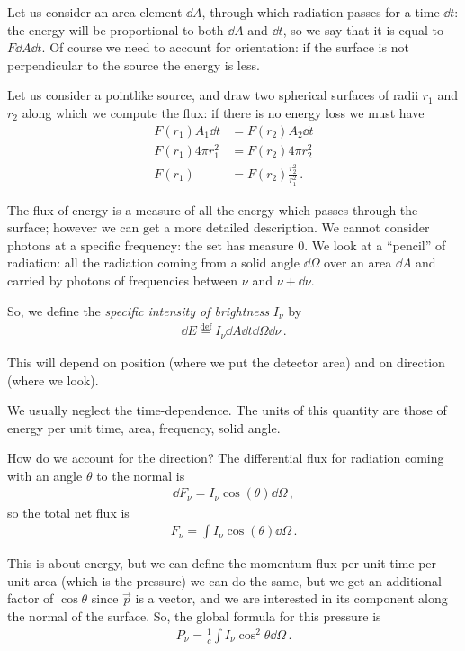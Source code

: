 \documentclass[main.tex]{subfiles}
\begin{document}
Let us consider an area element \(\dd{A}\), through which radiation passes for a time \(\dd{t}\): the energy will be proportional to both \(\dd{A}\) and \(\dd{t}\), so we say that it is equal to \(F \dd{A} \dd{t}\). Of course we need to account for orientation: if the surface is not perpendicular to the source the energy is less. 

Let us consider a pointlike source, and draw two spherical surfaces of radii \(r_1 \) and \(r_2 \) along which we compute the flux: if there is no energy loss we must have 
%
\begin{align}
F(r_1 ) A_1 \dd{t} &= F(r_2 ) A_2 \dd{t}  \\
 F(r_1 ) 4 \pi r_1^2 &= F(r_2 ) 4 \pi r_2^2 \\
 F(r_1 ) &= F(r_2 ) \frac{r_2^2}{r_1^2}
\,.
\end{align}

The flux of energy is a measure of all the energy which passes through the surface; however we can get a more detailed description. 
We cannot consider photons at a specific frequency: the set has measure 0. 
We look at a ``pencil'' of radiation: all the radiation coming from a solid angle \(\dd{\Omega  }\) over an area \(\dd{A}\) and carried by photons of frequencies between \(\nu \) and \(\nu + \dd{\nu }\).

So, we define the \emph{specific intensity of brightness} \(I_{\nu }\) by
%
\begin{align}
\dd{E} \overset{\text{def}}{=} I_{\nu } \dd{A} \dd{t} \dd{\Omega } \dd{\nu }
\,.
\end{align}

This will depend on position (where we put the detector area) and on direction (where we look). 

We usually neglect the time-dependence. The units of this quantity are those of energy per unit time, area, frequency, solid angle. 

How do we account for the direction? 
The differential flux for radiation coming with an angle \(\theta \) to the normal is 
%
\begin{align}
\dd{F_{\nu } } = I_{\nu  } \cos(\theta ) \dd{\Omega }
\,,
\end{align}
%
so the total net flux is 
%
\begin{align}
F_{\nu } = \int I_{\nu } \cos(\theta ) \dd{\Omega }
\,.
\end{align}

This is about energy, but we can define the momentum flux per unit time per unit area (which is the pressure) we can do the same, but we get an additional factor of \(\cos \theta \) since \(\vec{p}\) is a vector, and we are interested in its component along the normal of the surface.
So, the global formula for this pressure is 
%
\begin{align}
P_{\nu } = \frac{1}{c} \int I_{\nu } \cos^2\theta \dd{\Omega } 
\,.
\end{align}
\end{document}
